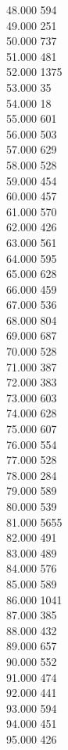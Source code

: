 { 48.000	594 \\
 49.000	251 \\
 50.000	737 \\
 51.000	481 \\
 52.000	1375 \\
 53.000	35 \\
 54.000	18 \\
 55.000	601 \\
 56.000	503 \\
 57.000	629 \\
 58.000	528 \\
 59.000	454 \\
 60.000	457 \\
 61.000	570 \\
 62.000	426 \\
 63.000	561 \\
 64.000	595 \\
 65.000	628 \\
 66.000	459 \\
 67.000	536 \\
 68.000	804 \\
 69.000	687 \\
 70.000	528 \\
 71.000	387 \\
 72.000	383 \\
 73.000	603 \\
 74.000	628 \\
 75.000	607 \\
 76.000	554 \\
 77.000	528 \\
 78.000	284 \\
 79.000	589 \\
 80.000	539 \\
 81.000	5655 \\
 82.000	491 \\
 83.000	489 \\
 84.000	576 \\
 85.000	589 \\
 86.000	1041 \\
 87.000	385 \\
 88.000	432 \\
 89.000	657 \\
 90.000	552 \\
 91.000	474 \\
 92.000	441 \\
 93.000	594 \\
 94.000	451 \\
 95.000	426 \\
}
